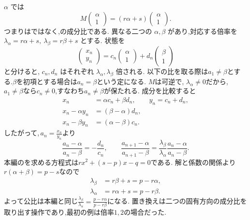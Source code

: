  $\alpha$ では
\[
  M\begin{pmatrix}\alpha\\1\end{pmatrix}
  =(r\alpha+s)\begin{pmatrix}\alpha\\1\end{pmatrix}.
\]
つまりはではなく,の成分比である.
異なる二つの $\alpha,\beta$ があり,対応する倍率を
$\lambda_\alpha=r\alpha+s,\ \lambda_\beta=r\beta+s$ とする.
状態を
\[
  \begin{pmatrix}x_n\\y_n\end{pmatrix}
  =c_n\begin{pmatrix}\alpha\\1\end{pmatrix}
  +d_n\begin{pmatrix}\beta\\1\end{pmatrix}
\]
と分けると,\,$\,c_n,d_n$ はそれぞれ $\lambda_\alpha,\lambda_\beta$ 倍される.
以下の比を取る際は$a_1\ne\beta$とする.$\beta$を初項とする場合は$a_n=\beta$という定になる.
$M$は可逆で,\,\,$\lambda_\alpha\ne0$だから,\,\,$a_1\ne\beta$なら$c_n\ne0$,すなわち$a_n\ne\beta$が保たれる.
成分を比較すると
\[
  \begin{aligned}
    x_n&=\alpha c_n+\beta d_n,\qquad y_n=c_n+d_n,\\
    x_n-\alpha y_n&=(\beta-\alpha)d_n,\\
    x_n-\beta y_n&=(\alpha-\beta)c_n.
  \end{aligned}
\]
したがって,\,$\displaystyle a_n=\frac{x_n}{y_n}$より
\[
  \frac{a_n-\alpha}{a_n-\beta}=-\frac{d_n}{c_n},
  \qquad
  \frac{a_{n+1}-\alpha}{a_{n+1}-\beta}
  =\frac{\lambda_\beta}{\lambda_\alpha}
   \frac{a_n-\alpha}{a_n-\beta}.
\]
本編のを求める方程式は$rx^2+(s-p)x-q=0$である.
解と係数の関係より$r(\alpha+\beta)=p-s$なので
\[
  \begin{aligned}
    \lambda_\beta&=r\beta+s=p-r\alpha,\\
    \lambda_\alpha&=r\alpha+s=p-r\beta.
  \end{aligned}
\]
よって公比は本編と同じ$\displaystyle \frac{\lambda_\beta}{\lambda_\alpha}=\frac{p-r\alpha}{p-r\beta}$になる.
置き換えは二つの固有方向の成分比を取り出す操作であり,最初の例は倍率$1,2$の場合だった.

